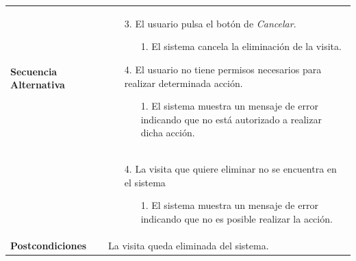 \begin{longtable}{| p{4cm} | p{10cm} |}
\\
\hline
\textbf{Secuencia Alternativa} &\mbox{}\par\vspace{-\baselineskip}
\begin{enumerate}[leftmargin=0.7cm, topsep=0.1cm]
\item[3.] El usuario pulsa el botón de \textit{Cancelar}.
	\begin{itemize}
	\item[1.] El sistema cancela la eliminación de la visita.
	\end{itemize}
\item[4.] El usuario no tiene permisos necesarios para realizar determinada acción.
	\begin{itemize}
	\item[1.] El sistema muestra un mensaje de error indicando que no está autorizado a realizar dicha acción.
	\end{itemize}
\end{enumerate}
\\ &\mbox{}\par\vspace{-\baselineskip}	
\begin{enumerate}[leftmargin=0.7cm, topsep=0.1cm]
\item[4.] La visita que quiere eliminar no se encuentra en el sistema
	\begin{itemize}
	\item[1.] El sistema muestra un mensaje de error indicando que no es posible realizar la acción.
	\end{itemize}
\end{enumerate}
\\

\hline
\textbf{Postcondiciones} & 
La visita queda eliminada del sistema.\\
\hline
\end{longtable}



\newpage
